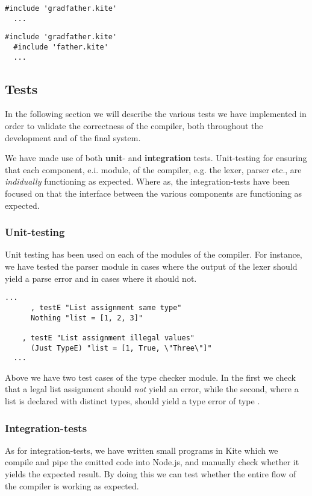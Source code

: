 \begin{lstlisting}[caption=\code{father.kite}]
  #include 'gradfather.kite'
  ...
\end{lstlisting}

\begin{lstlisting}[caption=\code{child.kite}]
  #include 'gradfather.kite'
  #include 'father.kite'
  ...
\end{lstlisting}


\subsection{Tests}
In the following section we will describe the various tests we have
implemented in order to validate the correctness of the compiler, both
throughout the development and of the final system.

We have made use of both \textbf{unit}- and \textbf{integration}
tests. Unit-testing for ensuring that each component, e.i. module, of the compiler,
e.g. the lexer, parser etc., are \emph{indidually} functioning as
expected. Where as, the integration-tests have been focused on that
the interface between the various components are functioning as
expected.

\subsubsection{Unit-testing}
Unit testing has been used on each of the modules of the
compiler. For instance, we have tested the parser module in cases
where the output of the lexer should yield a parse error and in cases
where it should not.

\begin{lstlisting}[caption=\code{Kite.Test.TypeCheck.hs} snippet]
  ...
      , testE "List assignment same type"
      Nothing "list = [1, 2, 3]"

    , testE "List assignment illegal values"
      (Just TypeE) "list = [1, True, \"Three\"]"
  ...
\end{lstlisting}

Above we have two test cases of the type checker module. In the first
we check that a legal list assignment should \emph{not} yield an
error, while the second, where a list is declared with distinct types,
should yield a type error of type .

\subsubsection{Integration-tests}
As for integration-tests, we have written small programs in Kite which
we compile and pipe the emitted code into Node.js, and manually check
whether it yields the expected result. By doing this we can test
whether the entire flow of the compiler is working as expected.

